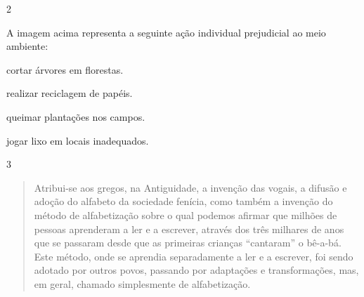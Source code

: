 \num{2}


A imagem acima representa a seguinte ação individual prejudicial ao meio
ambiente:

\begin{escolha}
\item cortar árvores em florestas.

\item realizar reciclagem de papéis.

\item queimar plantações nos campos.

\item jogar lixo em locais inadequados.
\end{escolha}


\num{3}

\begin{quote}
Atribui-se aos gregos, na Antiguidade, a invenção das vogais, a
difusão e adoção do alfabeto da sociedade fenícia, como também a
invenção do método de alfabetização sobre o qual podemos afirmar que
milhões de pessoas aprenderam a ler e a escrever, através dos três
milhares de anos que se passaram desde que as primeiras crianças
``cantaram'' o bê-a-bá. Este método, onde se aprendia separadamente a
ler e a escrever, foi sendo adotado por outros povos, passando por
adaptações e transformações, mas, em geral, chamado simplesmente de
alfabetização.

\end{quote}

